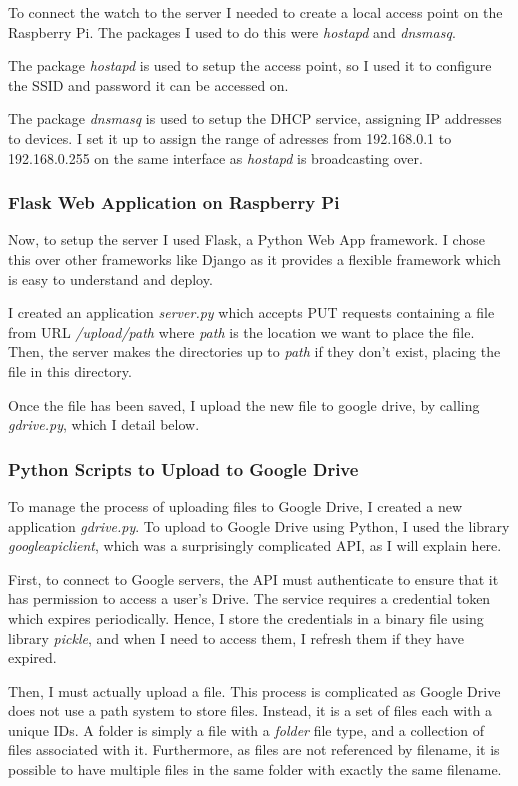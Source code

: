 \documentclass[12pt,a4paper,twoside,openany]{report}
\begin{document}
To connect the watch to the server I needed to create a local access point on the
Raspberry Pi. The
packages I used to do this were \emph{hostapd} and \emph{dnsmasq}. 

The package \emph{hostapd} is used to setup the access point, so I used it to
configure the
SSID and password it can be accessed on. 

The package \emph{dnsmasq} is used to setup the DHCP service, assigning IP
addresses to devices. I set it up to assign the range of adresses from 192.168.0.1 to
192.168.0.255 on the same interface as \emph{hostapd} is broadcasting over.

\subsubsection{Flask Web Application on Raspberry Pi}

Now, to setup the server I used Flask, a Python Web App framework. I chose
this over other frameworks like Django as it provides a flexible framework
which is easy to understand and deploy.

I created an application \emph{server.py} which
accepts PUT requests containing a file from URL \emph{/upload/path} where
\emph{path} is the location we want to place the file. Then, the server
makes the directories up to \emph{path} if they don't exist, placing the file
in this directory. 

Once the file has been saved, I upload the new file to google drive, by
calling \emph{gdrive.py}, which I detail below.

\subsubsection{Python Scripts to Upload to Google Drive}

To manage the process of uploading files to Google Drive, I created a new
application \emph{gdrive.py}. To upload to Google Drive using Python, I used
the library \emph{googleapiclient}, which was a surprisingly complicated API,
as I will explain here.

First, to connect to Google servers, the API must authenticate to ensure that
it has permission to access a user's Drive. The service requires a credential
token which expires periodically. Hence, I store the credentials in a binary
file using library \emph{pickle}, and when I need to access them, I 
refresh them if they have expired.

Then, I must actually upload a file. This process is complicated as Google
Drive does not use a path system to store files. Instead, it is a set of files
each with a unique IDs. A folder is simply a file with a \emph{folder} file
type, and a collection of files associated with it. Furthermore, as files are
not referenced by filename, it is possible to have multiple files in the same
folder with exactly the same filename.
\end{document}
